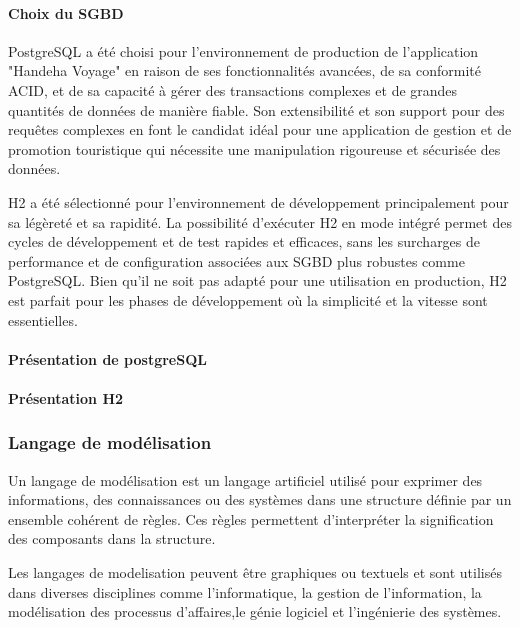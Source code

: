 \documentclass[12pt]{report}
\begin{document}
				\paragraph{Choix du SGBD} 
				
				 PostgreSQL a été choisi pour l'environnement de production de l'application "Handeha Voyage" en raison de ses fonctionnalités avancées, de sa conformité ACID, et de sa capacité à gérer des transactions complexes et de grandes quantités de données de manière fiable. Son extensibilité et son support pour des requêtes complexes en font le candidat idéal pour une application de gestion et de promotion touristique qui nécessite une manipulation rigoureuse et sécurisée des données.

				H2 a été sélectionné pour l'environnement de développement principalement pour sa légèreté et sa rapidité. La possibilité d'exécuter H2 en mode intégré permet des cycles de développement et de test rapides et efficaces, sans les surcharges de performance et de configuration associées aux SGBD plus robustes comme PostgreSQL. Bien qu'il ne soit pas adapté pour une utilisation en production, H2 est parfait pour les phases de développement où la simplicité et la vitesse sont essentielles.				

				\paragraph{Présentation de postgreSQL}

				\paragraph{Présentation H2}

				\subsubsection{Langage de modélisation}

				\hspace{15pt} Un langage de modélisation est un langage artificiel utilisé pour exprimer des informations, des connaissances ou des systèmes dans une structure définie par un ensemble cohérent de règles. Ces règles permettent d'interpréter la signification des composants dans la structure. 

				Les langages de modelisation peuvent être graphiques ou textuels et sont utilisés dans diverses disciplines comme l'informatique, la gestion de l'information, la modélisation des processus d'affaires,le génie logiciel et l'ingénierie des systèmes.
\end{document}

